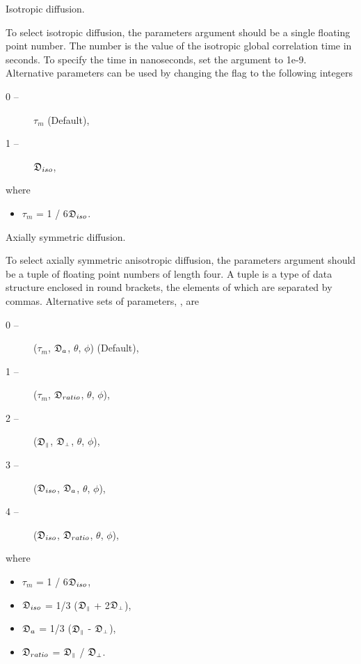 Isotropic diffusion.

To select isotropic diffusion, the parameters argument should be a single floating point
number.  The number is the value of the isotropic global correlation time in seconds.  To
specify the time in nanoseconds, set the 
 argument to 1e-9.  Alternative
parameters can be used by changing the 
 flag to the following integers

\begin{description}
\item[    0 --]   $\tau_m$   (Default),
\item[    1 --]   $\mathfrak{D}_{iso}$,
\end{description}

where

\begin{itemize}
\item[]     $\tau_m$ = 1 / 6$\mathfrak{D}_{iso}$.
\end{itemize}


Axially symmetric diffusion.

To select axially symmetric anisotropic diffusion, the parameters argument should be a tuple
of floating point numbers of length four.  A tuple is a type of data structure enclosed in
round brackets, the elements of which are separated by commas.  Alternative sets of
parameters, 
, are

\begin{description}
\item[    0 --]   ($\tau_m$, $\mathfrak{D}_a$, $\theta$, $\phi$)   (Default),
\item[    1 --]   ($\tau_m$, $\mathfrak{D}_{ratio}$, $\theta$, $\phi$),
\item[    2 --]   ($\mathfrak{D}_{\scriptscriptstyle \parallel}$, $\mathfrak{D}_{\scriptscriptstyle \perp}$, $\theta$, $\phi$),
\item[    3 --]   ($\mathfrak{D}_{iso}$, $\mathfrak{D}_a$, $\theta$, $\phi$),
\item[    4 --]   ($\mathfrak{D}_{iso}$, $\mathfrak{D}_{ratio}$, $\theta$, $\phi$),
\end{description}

where

\begin{itemize}
\item[]     $\tau_m$ = 1 / 6$\mathfrak{D}_{iso}$,
\item[]     $\mathfrak{D}_{iso}$ = 1/3 ($\mathfrak{D}_{\scriptscriptstyle \parallel}$ + 2$\mathfrak{D}_{\scriptscriptstyle \perp}$),
\item[]     $\mathfrak{D}_a$ = 1/3 ($\mathfrak{D}_{\scriptscriptstyle \parallel}$ - $\mathfrak{D}_{\scriptscriptstyle \perp}$),
\item[]     $\mathfrak{D}_{ratio}$ = $\mathfrak{D}_{\scriptscriptstyle \parallel}$ / $\mathfrak{D}_{\scriptscriptstyle \perp}$.
\end{itemize}

